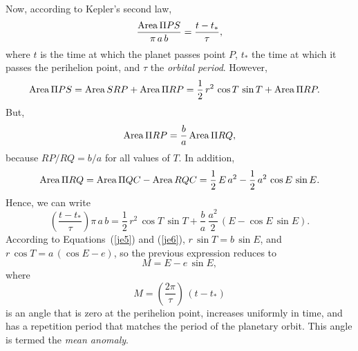 Now, according to Kepler's second law,
\begin{equation}
\frac{{\rm Area}\,\Pi PS}{\pi\,a\,b} = \frac{t-t_\ast}{\tau},
\end{equation}
where $t$ is the time at which the planet passes point $P$,  $t_\ast$  the time at which it passes the perihelion point,
and $\tau$ the {\em orbital period}.
However,
\begin{align}
{\rm Area}  \,\Pi PS &= {\rm Area}\, SRP + {\rm Area} \,\Pi RP
= \frac{1}{2}\,r^2\,\cos T\,\sin T + {\rm Area}\,\Pi RP.
\end{align}
But,
\begin{equation}
{\rm Area}\,\Pi RP = \frac{b}{a}\,{\rm Area}\,\Pi RQ,
\end{equation}
because $RP/RQ = b/a$ for all values of $T$. In addition, 
\begin{align}
{\rm Area}\,\Pi RQ = {\rm Area}\,\Pi QC - {\rm Area}\,RQC= \frac{1}{2}\,E\,a^2 - \frac{1}{2}\,a^2\,\cos E\,\sin E.
\end{align}
Hence, we can write
\begin{equation}
\left(\frac{t-t_\ast}{\tau}\right) \pi\,a\,b= \frac{1}{2}\,r^2\,\cos T\,\sin T + \frac{b}{a}\,\frac{a^2}{2}\,(E - \cos E\,\sin E).
\end{equation}
According to Equations~(\ref{je5}) and (\ref{je6}), $r\,\sin T = b\,\sin E$, and $r\,\cos T = a\,(\cos E - e)$, so
the previous expression reduces to
\begin{equation}
M = E - e\,\sin E,
\end{equation}
where
\begin{equation}
M = \left(\frac{2\pi}{\tau}\right)\,(t-t_\ast)
\end{equation}
is an angle that is zero at the perihelion point, increases  uniformly in time, and has a repetition period that 
matches the period of the planetary orbit. This angle is termed the {\em mean anomaly}. 

